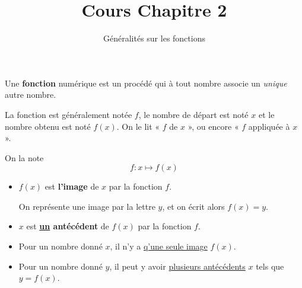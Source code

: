 \documentclass[
	classe=$1^{ere}$STI2D
]{coursclass}
\title{Cours Chapitre 2}
\author{Généralités sur les fonctions}
\date{}
\begin{document}
\maketitle

\begin{definition}[Fonction]
	Une \textbf{fonction} numérique est un procédé qui à tout nombre associe un \textit{unique} autre nombre.

	La fonction est généralement notée $f$, le nombre de départ est noté $x$ et le nombre obtenu est noté $f(x)$. On le lit « $f$ de $x$ », ou encore « $f$ appliquée à $x$ ».

	On la note
	$$ f : x ↦ f(x) $$

	\begin{itemize}
		\item $f(x)$ est \textbf{l'image} de $x$ par la fonction $f$.

		      On représente une image par la lettre $y$, et on écrit alors \uline{$f(x) = y$}.
		\item $x$ est \textbf{\uline{un} antécédent} de $f(x)$ par la fonction $f$.
	\end{itemize}
\end{definition}

\begin{remarque}
	\begin{itemize}
		\item Pour un nombre donné $x$, il n'y a \uline{q'une seule image} $f(x)$.
		\item Pour un nombre donné $y$, il peut y avoir \uline{plusieurs antécédents} $x$ tels que $y = f(x)$.
	\end{itemize}
\end{remarque}
\end{document}
